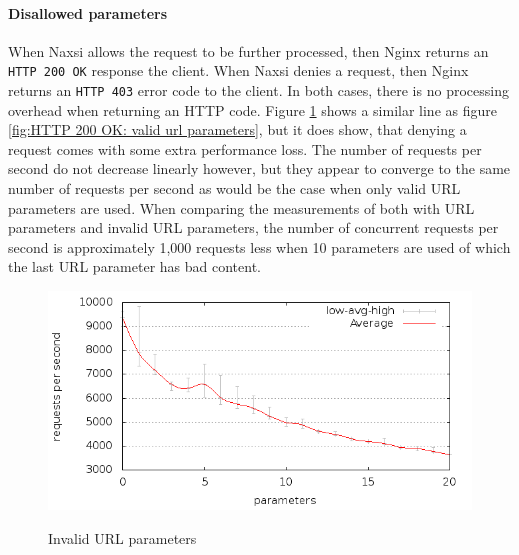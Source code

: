 \documentclass[Experiments]{subfiles}
\begin{document}
\paragraph{Disallowed parameters}
When Naxsi allows the request to be further processed, then Nginx returns an \verb+HTTP 200 OK+ response the client. When Naxsi denies a request, then Nginx returns an \verb+HTTP 403+ error code to the client. In both cases, there is no processing overhead when returning an HTTP code. Figure \ref{fig:HTTP 200 OK: invalid url parameters} shows a similar line as figure \ref{fig:HTTP 200 OK: valid url parameters}, but it does show, that denying a request comes with some extra performance loss. The number of requests per second do not decrease linearly however, but they appear to converge to the same number of requests per second as would be the case when only valid \ac{URL} parameters are used. When comparing the measurements of both with \ac{URL} parameters and invalid \ac{URL} parameters, the number of concurrent requests per second is approximately 1,000 requests less when 10 parameters are used of which the last \ac{URL} parameter has bad content.

\begin{figure}[H]
\caption{Invalid URL parameters}
\centering
\includegraphics[scale=0.55] {images/results/200_with_naxsi_incremented_disallowed_parameters/output.png}
\label{fig:HTTP 200 OK: invalid url parameters}
\end{figure}
\end{document}
